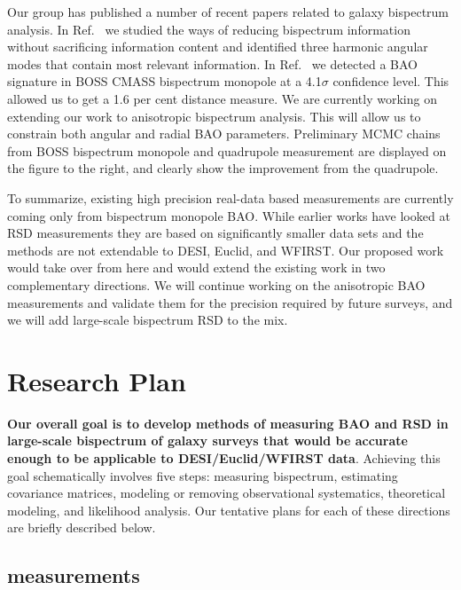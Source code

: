 Our group has published a number of recent papers related to galaxy bispectrum
analysis. In Ref.~\cite{2017MNRAS.467..928G} we studied the ways of reducing
bispectrum information without sacrificing information content and identified
three harmonic angular modes that contain most relevant information. In
Ref.~\cite{2018MNRAS.478.4500P} we detected a BAO signature in BOSS CMASS
bispectrum monopole at a 4.1$\sigma$ confidence level. This allowed us to
get a 1.6 per cent distance measure. We are currently working on extending our
work to anisotropic bispectrum analysis. This will allow us to constrain both
angular and radial BAO parameters. Preliminary MCMC chains from BOSS bispectrum
monopole and quadrupole measurement are displayed on the figure to the right,
and clearly show the improvement from the quadrupole.

To summarize, existing high precision real-data based measurements are
currently coming only from bispectrum monopole BAO. While earlier works have
looked at RSD measurements they are based on significantly smaller data sets
and the methods are not extendable to DESI, Euclid, and WFIRST. Our proposed work
would take over from here and would extend the existing work in two
complementary directions. We will continue working on the anisotropic BAO
measurements and validate them for the precision required by future surveys,
and we will add large-scale bispectrum RSD to the mix.

\section{Research Plan}

\textbf{Our overall goal is to develop methods of measuring BAO and RSD in
large-scale bispectrum of galaxy surveys that would be accurate enough to be
applicable to DESI/Euclid/WFIRST data}. Achieving this goal schematically
involves five steps: measuring bispectrum, estimating covariance matrices,
modeling or removing observational systematics, theoretical modeling, and
likelihood analysis. Our tentative plans for each of these directions are
briefly described below.

\subsection*{measurements}

